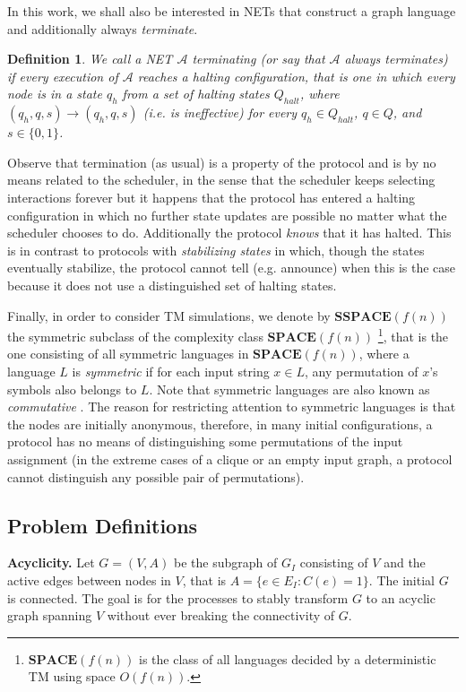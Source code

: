 \documentclass[preprint]{elsarticle}
\newcommand{\rem}{\mathbf}
\newcommand{\ca}{\mathcal{A}}
\newcommand{\ra}{\rightarrow}
\newtheorem{definition}{Definition}
\begin{document}
In this work, we shall also be interested in NETs that construct a graph language and additionally always \emph{terminate}. 

\begin{definition}
We call a NET $\ca$ \emph{terminating} (or say that $\ca$ \emph{always terminates}) if every execution of $\ca$ reaches a \emph{halting} configuration, that is one in which every node is in a state $q_{h}$ from a set of halting states $Q_{halt}$, where $(q_h,q,s)\ra (q_h,q,s)$ (i.e. is ineffective) for every $q_h\in Q_{halt}$, $q\in Q$, and $s\in \{0,1\}$. 
\end{definition}

Observe that termination (as usual) is a property of the protocol and is by no means related to the scheduler, in the sense that the scheduler keeps selecting interactions forever but it happens that the protocol has entered a halting configuration in which no further state updates are possible no matter what the scheduler chooses to do. Additionally the protocol \emph{knows} that it has halted. This is in contrast to protocols with \emph{stabilizing states} \cite{CMNS13} in which, though the states eventually stabilize, the protocol cannot tell (e.g. announce) when this is the case because it does not use a distinguished set of halting states.

Finally, in order to consider TM simulations, we denote by $\rem{SSPACE}(f(n))$ the symmetric subclass of the complexity class $\rem{SPACE}(f(n))$ \footnote{$\rem{SPACE}(f(n))$ is the class of all languages decided by a deterministic TM using space $O(f(n))$.}, that is the one consisting of all symmetric languages in $\rem{SPACE}(f(n))$, where a language $L$ is \emph{symmetric} if for each input string $x\in L$, any permutation of $x$'s symbols also belongs to $L$. Note that symmetric languages are also known as \emph{commutative} \cite{FMR68}. The reason for restricting attention to symmetric languages is that the nodes are initially anonymous, therefore, in many initial configurations, a protocol has no means of distinguishing some permutations of the input assignment (in the extreme cases of a clique or an empty input graph, a protocol cannot distinguish any possible pair of permutations).   

\subsection{Problem Definitions}
\label{subsec:problems}

\noindent\textbf{Acyclicity.} Let $G=(V,A)$ be the subgraph of $G_I$ consisting of $V$ and the active edges between nodes in $V$, that is $A=\{e\in E_I: C(e)=1\}$. The initial $G$ is connected. The goal is for the processes to stably transform $G$ to an acyclic graph spanning $V$ without ever breaking the connectivity of $G$.\\
\end{document}
